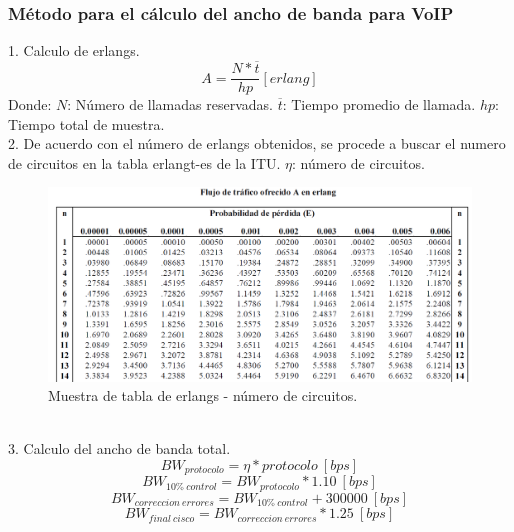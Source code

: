 \documentclass[12pt,letterpaper]{article}
\begin{document}
\subsubsection{Método para el cálculo del ancho de banda para VoIP}
1. Calculo de erlangs.
\begin{equation}
    A=\frac{N* \overline{t}}{hp}[erlang]
\end{equation}
Donde: \newline
$N$: Número de llamadas reservadas. \newline
$\overline{t}$: Tiempo promedio de llamada. \newline
$hp$: Tiempo total de muestra. \newline
\\
2. De acuerdo con el número de erlangs obtenidos, se procede a buscar el numero de circuitos 
en la tabla erlangt-es de la ITU. $\eta$: número de circuitos.
\begin{figure}[ht]
    \centering
    \includegraphics[width=.8\textwidth]{imagenes/tablaerlang.PNG}
    \caption{Muestra de tabla de erlangs - número de circuitos.}
\end{figure}
\\
3. Calculo del ancho de banda total.
\begin{equation}
    BW_{protocolo}=\eta * protocolo \ [bps]
\end{equation}
\begin{equation}
    BW_{10\% \ control}=BW_{protocolo}*1.10 \ [bps]
\end{equation}
\begin{equation}
    BW_{correccion \ errores}=BW_{10\% \ control}+300000 \ [bps]
\end{equation}
\begin{equation}
    BW_{final \ cisco}=BW_{correccion \ errores}*1.25 \ [bps]
\end{equation}
\end{document}
